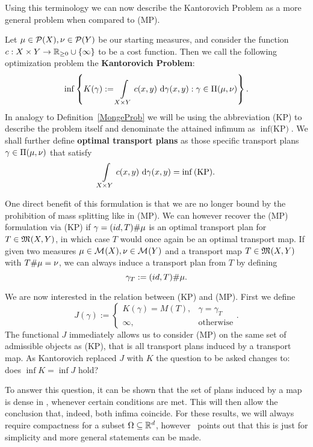 Using this terminology we can now describe the Kantorovich Problem as a more general problem when compared to (MP).

\begin{definition}\label{KanProb}
	Let $\mu \in \PM{X}, \nu \in \PM{Y}$ be our starting measures, and consider the function $\map[c]{X \times Y}{\RZero \cup \{\infty\}}$ to be a cost function. Then we call the following optimization problem the \textbf{Kantorovich Problem}:
	\[ \inf \left\{ K(\gamma) := \int\limits_{X \times Y} c(x, y)~\Dx[x, y]{\gamma} : \gamma \in \TP{\mu}{\nu} \right\}. \]
	In analogy to Definition~\ref{MongeProb} we will be using the abbreviation (KP) to describe the problem itself and denominate the attained infimum as $\inf \text{(KP)}$. We shall further define \textbf{optimal transport plans} as those specific transport plans $\gamma \in \TP{\mu}{\nu}$ that satisfy
	\[ \int\limits_{X \times Y} c(x, y)~\Dx[x, y]{\gamma} = \inf \text{(KP)}. \]
\end{definition}

One direct benefit of this formulation is that we are no longer bound by the prohibition of mass splitting like in (MP). We can however recover the (MP) formulation via (KP) if $\gamma = \push[(id, T)]{\mu}$ is an optimal transport plan for $T \in \MF{X}{Y}$, in which case $T$ would once again be an optimal transport map. If given two measures $\mu \in \M{X}, \nu \in \M{Y}$ and a transport map $T \in \MF{X}{Y}$ with $\push{\mu} = \nu$, we can always induce a transport plan from $T$ by defining
\begin{equation}\label{IndPlan}
	\gamma_T := \push[(id, T)]{\mu}.
\end{equation}

We are now interested in the relation between (KP) and (MP). First we define
\[ J(\gamma) := 
	\begin{cases}
		K(\gamma) = M(T), & \gamma = \gamma_T \\
		\infty, & \text{otherwise}
	\end{cases}. \]
The functional $J$ immediately allows us to consider (MP) on the same set of admissible objects as (KP), that is all transport plans induced by a transport map. As Kantorovich replaced $J$ with $K$ the question to be asked changes to: does $\inf K = \inf J$ hold?

To answer this question, it can be shown that the set of plans induced by a map is dense in \TP{\mu}{\nu}, whenever certain conditions are met. This will then allow the conclusion that, indeed, both infima coincide. For these results, we will always require compactness for a subset $\Omega \subseteq \R^d$, however~\cite{San2015} points out that this is just for simplicity and more general statements can be made.

